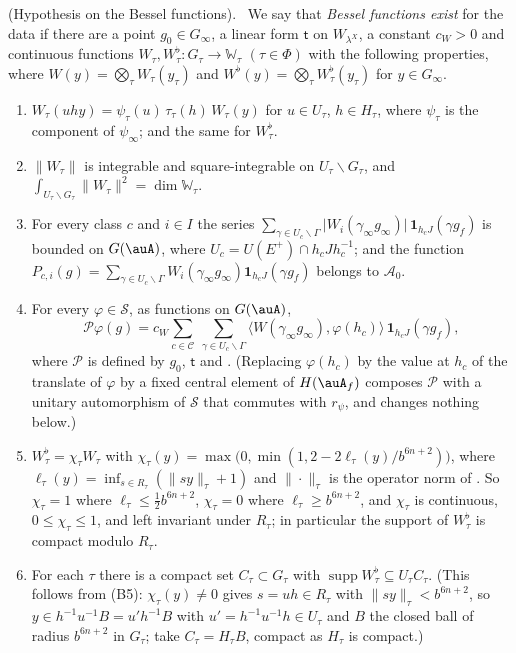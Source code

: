 \documentclass[10pt]{amsart}
\theoremstyle{definition}
\theoremstyle{remark}
\providecommand{\auAz}{\mathcal A_0}
\providecommand{\auP}{\mathcal P}
\providecommand{\auPl}{\Phi}
\providecommand{\auS}{\mathcal S}
\providecommand{\pbW}{\mathbb W}
\providecommand{\pbip}[2]{\langle#1,#2\rangle}
\providecommand{\pbone}{\mathbf 1}
\providecommand{\pbrpsi}{r_\psi}
\newenvironment{quoteddef}[2]{\par\medskip\noindent\begingroup
  \textbf{#1}#2.\ \ignorespaces}{\endgroup\par\medskip}
\begin{document}
\begin{quoteddef}{\cite[Definition~2.16]{P51}}{ (Hypothesis on the Bessel functions)}
We say that \emph{Bessel functions exist} for the data if there are a point $g_0\in G_\infty$, a
linear form $\mathsf t$ on $W_{\lambda^X}$, a constant $c_W>0$ and continuous functions
$W_\tau,W_\tau^\flat\colon G_\tau\to\pbW_\tau$ $(\tau\in\auPl)$ with the following properties, where
$W(y)=\bigotimes_\tau W_\tau(y_\tau)$ and $W^\flat(y)=\bigotimes_\tau W^\flat_\tau(y_\tau)$ for
$y\in G_\infty$.
\begin{enumerate}
\item[(B1)] $W_\tau(uhy)=\psi_\tau(u)\,\tau_\tau(h)\,W_\tau(y)$ for $u\in U_\tau$, $h\in H_\tau$,
where $\psi_\tau$ is the component of $\psi_\infty$; and the same for $W_\tau^\flat$.
\item[(B2)] $\|W_\tau\|$ is integrable and square-integrable on $U_\tau\backslash G_\tau$, and
$\int_{U_\tau\backslash G_\tau}\|W_\tau\|^2=\dim\pbW_\tau$.
\item[(B3)] For every class $c$ and $i\in I$ the series $\sum_{\gamma\in U_c\backslash\Gamma}
\bigl|W_i(\gamma_\infty g_\infty)\bigr|\,\pbone_{h_cJ}(\gamma g_f)$ is bounded on $G(\auA)$, where
$U_c=U(E^+)\cap h_cJh_c^{-1}$; and the function $P_{c,i}(g)=\sum_{\gamma\in U_c\backslash\Gamma}W_i(
\gamma_\infty g_\infty)\pbone_{h_cJ}(\gamma g_f)$ belongs to $\auAz$.
\item[(B4)] For every $\varphi\in\auS$, as functions on $G(\auA)$,
\[
\auP\varphi(g)=c_W\sum_{c\in\mathcal C}\ \sum_{\gamma\in U_c\backslash\Gamma}\pbip{W(\gamma_\infty
g_\infty)}{\varphi(h_c)}\,\pbone_{h_cJ}(\gamma g_f),
\]
where $\auP$ is defined by $g_0$, $\mathsf t$ and {\cite[(4)]{P51}}. (Replacing $\varphi(h_c)$ by
the value at $h_c$ of the translate of $\varphi$ by a fixed central element of $H(\auA_f)$ composes
$\auP$ with a unitary automorphism of $\auS$ that commutes with $\pbrpsi$, and changes nothing below.)
\item[(B5)] $W^\flat_\tau=\chi_\tau W_\tau$ with
$\chi_\tau(y)=\max\bigl(0,\min(1,2-2\ell_\tau(y)/b^{6n+2})\bigr)$, where
$\ell_\tau(y)=\inf_{s\in R_\tau}(\|sy\|_\tau+1)$ and $\|\cdot\|_\tau$ is the operator norm of
{\cite[Definition~3.14]{P51}}. So $\chi_\tau=1$ where $\ell_\tau\le\frac12b^{6n+2}$, $\chi_\tau=0$
where $\ell_\tau\ge b^{6n+2}$, and $\chi_\tau$ is continuous, $0\le\chi_\tau\le1$, and left
invariant under $R_\tau$; in particular the support of $W^\flat_\tau$ is compact modulo $R_\tau$.
\item[(B5$'$)] For each $\tau$ there is a compact set $C_\tau\subset G_\tau$ with
$\operatorname{supp}W^\flat_\tau\subseteq U_\tau C_\tau$. (This follows from (B5): $\chi_\tau(y)\ne0$ gives
$s=uh\in R_\tau$ with $\|sy\|_\tau<b^{6n+2}$, so $y\in h^{-1}u^{-1}B=u'h^{-1}B$ with $u'=h^{-1}u^{-1}h\in
U_\tau$ and $B$ the closed ball of radius $b^{6n+2}$ in $G_\tau$; take $C_\tau=H_\tau B$, compact as
$H_\tau$ is compact.)
\end{enumerate}
\end{quoteddef}
\end{document}
